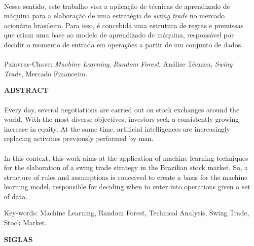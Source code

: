 \paragraph{} Nesse sentido, este trabalho visa a aplicação de técnicas de aprendizado de máquina para a elaboração de uma estratégia de \textit{swing trade} no mercado acionário brasileiro. Para isso, é concebida uma estrutura de regras e premissas que criam uma base ao modelo de aprendizado de máquina, responsável por decidir o momento de entrada em operações a partir de um conjunto de dados.

\paragraph{}
\noindent Palavras-Chave: \textit{Machine Learning}, \textit{Random Forest}, Análise Técnica, \textit{Swing Trade}, Mercado Financeiro.

\pagebreak


\begin{center}
\textbf{ABSTRACT}
\end{center}
      \vspace{0.5cm}

\paragraph{} Every day, several negotiations are carried out on stock exchanges around the world. With the most diverse objectives, investors seek a consistently growing increase in equity. At the same time, artificial intelligences are increasingly replacing activities previously performed by man.

\paragraph{} In this context, this work aims at the application of machine learning techniques for the elaboration of a swing trade strategy in the Brazilian stock market. So, a structure of rules and assumptions is conceived to create a basis for the machine learning model, responsible for deciding when to enter into operations given a set of data.

\noindent Key-words: Machine Learning, Random Forest, Technical Analysis, Swing Trade, Stock Market.

\pagebreak


\begin{center}
\textbf{SIGLAS}
\end{center}

